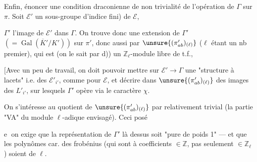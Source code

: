  Enfin,  énoncer une condition
draconienne de non trivialité de l'opération de \(\Gamma\) sur \(\pi\).
Soit \(\mathcal E'\) un sous-groupe 
d'indice fini) de \(\mathcal E\),



\(\Gamma'\) l'image de \(\mathcal E'\) dans \(\Gamma\). On trouve donc une
extension de \(\Gamma'\) \((=\operatorname{Gal}(\overline K'/K'))\) sur \(\pi'\),
donc aussi par \(\unsure{(\pi'_{ab})_{(\ell)}}\)
(\(\ell\) étant un nb premier), qui est (on le sait par d)) un
\(\mathbb Z_\ell\)-module libre de t.f.,

[Avec un peu de travail, on doit pouvoir mettre sur
\(\mathcal E'\to\Gamma\) une "structure à lacets" i.e. des
\(\mathcal E'_{i'}\), comme pour \(\mathcal E\), et décrire dans
\(\unsure{(\pi'_{ab})_{(\ell)}}\)
 des images des  \(L'_{i'}\),
sur lesquels \(\Gamma'\) opère  via le caractère \(\chi\).


On s'intéresse au quotient de \(\unsure{(\pi'_{ab})_{(\ell)}}\) par
 relativement trivial (la partie "VA" du
module \(\ell\)-adique envisagé). Ceci posé

\textcircled{e} on exige que la représentation de \(\Gamma'\) là dessus soit
"pure de poids 1" ---  et que les polynômes car.
des frobénius (qui sont à coefficients \(\in\mathbb Z\), pas seulement
\(\in\mathbb Z_\ell\)) soient  de \(\ell\).


